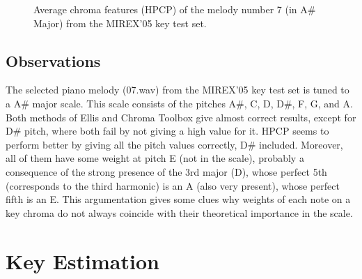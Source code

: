 \documentclass{article}
\begin{document}
\begin{figure}
 \centerline{}
 \caption{Average chroma features (HPCP) of the melody number 7 (in A\# Major) from the MIREX'05 key test set.}
 \label{fig:averagechroma07hpcp}
\end{figure}

\subsection{Observations} %

The selected piano melody (07.wav) from the MIREX'05 key test set is tuned to a A\# major scale. This scale consists of the pitches A\#, C, D, D\#, F, G, and A. Both methods of Ellis and Chroma Toolbox give almost correct results, except for D\# pitch, where both fail by not giving a high value for it. HPCP seems to perform better by giving all the pitch values correctly, D\# included. Moreover, all of them have some weight at pitch E (not in the scale), probably a consequence of the strong presence of the 3rd major (D), whose perfect 5th (corresponds to the third harmonic) is an A (also very present), whose perfect fifth is an E. This argumentation gives some clues why weights of each note on a key chroma do not always coincide with their theoretical importance in the scale.

\section{Key Estimation} 
\end{document}

